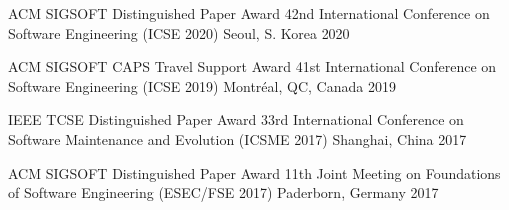  

\begin{cvhonors}

  \cvhonor
    {ACM SIGSOFT Distinguished Paper Award} %
    {42nd International Conference on Software Engineering ({ICSE} 2020)} %
    {Seoul, S. Korea} %
    {2020} %

  \cvhonor
    {ACM SIGSOFT CAPS Travel Support Award} %
    {41st International Conference on Software Engineering (ICSE 2019)} %
    {Montréal, QC, Canada} %
    {2019} %

  \cvhonor
    {IEEE TCSE Distinguished Paper Award} %
    {33rd International Conference on Software Maintenance and Evolution ({ICSME} 2017)} %
    {Shanghai, China} %
    {2017} %

  \cvhonor
    {ACM SIGSOFT Distinguished Paper Award} %
    {11th Joint Meeting on Foundations of Software Engineering ({ESEC/FSE} 2017)} %
    {Paderborn, Germany} %
    {2017} %

\end{cvhonors}
